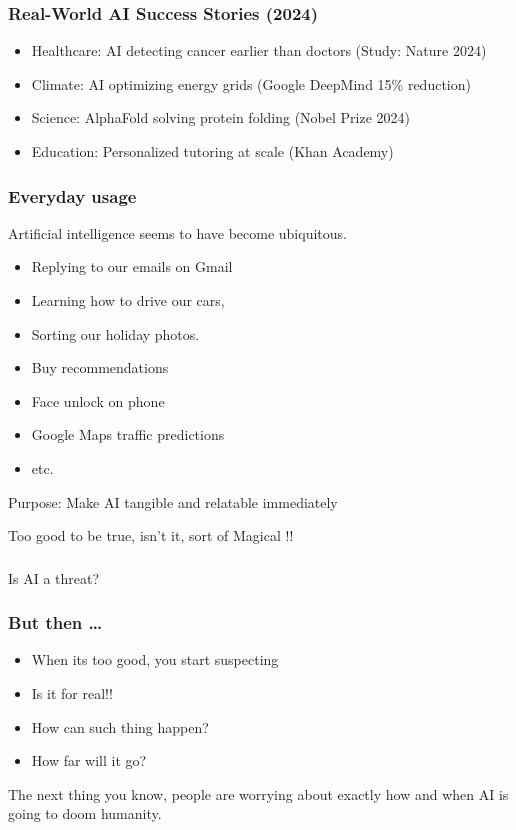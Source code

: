 \begin{frame}[fragile]\frametitle{Real-World AI Success Stories (2024)}
\begin{itemize}
\item Healthcare: AI detecting cancer earlier than doctors (Study: Nature 2024)
\item Climate: AI optimizing energy grids (Google DeepMind 15\% reduction)
\item Science: AlphaFold solving protein folding (Nobel Prize 2024)
\item Education: Personalized tutoring at scale (Khan Academy)
\end{itemize}
\end{frame}

\begin{frame}[fragile]\frametitle{Everyday usage}
Artificial intelligence seems to have become ubiquitous.
\begin{itemize}
\item Replying to our emails on Gmail
\item Learning how to drive our cars,
\item Sorting our holiday photos.
\item Buy recommendations
\item Face unlock on phone
\item Google Maps traffic predictions
\item etc.
\end{itemize}
Purpose: Make AI tangible and relatable immediately



Too good to be true, isn't it, sort of Magical !!
\end{frame}




\begin{frame}[fragile]\frametitle{}
\begin{center}
{\Large Is AI a threat?}
\end{center}
\end{frame}

\begin{frame}[fragile]\frametitle{But then \ldots}
\begin{itemize}
\item When its too good, you start suspecting
\item Is it for real!!
\item How can such thing happen?
\item How far will it go?
\end{itemize}
The next thing you know, people are worrying about exactly how and when AI is going to doom humanity.
\end{frame}



